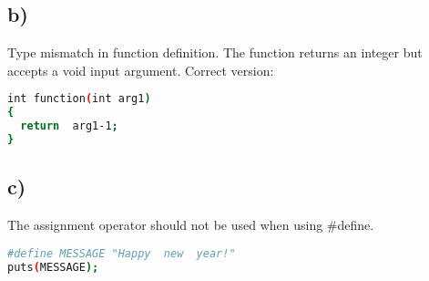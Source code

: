 \documentclass[12pt]{article}
\begin{document}
\subsection*{b)}
Type mismatch in function definition. The function returns an integer but accepts a void input argument. Correct version:

\begin{lstlisting}[frame=single, language=bash, breaklines=true]
int function(int arg1)
{
  return  arg1-1;
}
\end{lstlisting}

\subsection*{c)}
The assignment operator should not be used when using \#define.
\begin{lstlisting}[frame=single, language=bash, breaklines=true]
#define MESSAGE "Happy  new  year!"
puts(MESSAGE);
\end{lstlisting}



 
 
\end{document}
